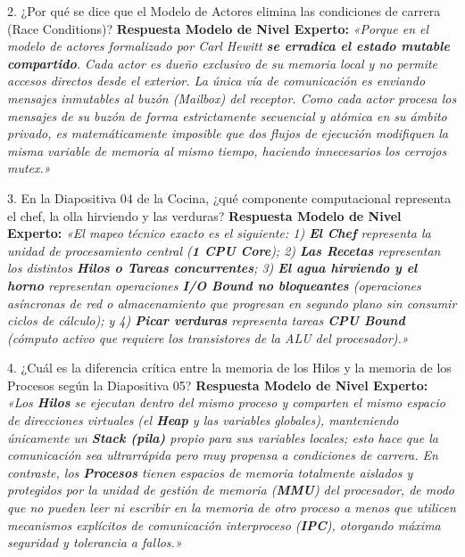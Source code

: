 \documentclass[11pt,a4paper]{article}
\begin{document}
\begin{qabox}{2. ¿Por qué se dice que el Modelo de Actores elimina las condiciones de carrera (Race Conditions)?}
\textbf{Respuesta Modelo de Nivel Experto:}  
\textit{«Porque en el modelo de actores formalizado por Carl Hewitt \textbf{se erradica el estado mutable compartido}. Cada actor es dueño exclusivo de su memoria local y no permite accesos directos desde el exterior. La única vía de comunicación es enviando mensajes inmutables al buzón (\textit{Mailbox}) del receptor. Como cada actor procesa los mensajes de su buzón de forma estrictamente secuencial y atómica en su ámbito privado, es matemáticamente imposible que dos flujos de ejecución modifiquen la misma variable de memoria al mismo tiempo, haciendo innecesarios los cerrojos mutex.»}
\end{qabox}

\begin{qabox}{3. En la Diapositiva 04 de la Cocina, ¿qué componente computacional representa el chef, la olla hirviendo y las verduras?}
\textbf{Respuesta Modelo de Nivel Experto:}  
\textit{«El mapeo técnico exacto es el siguiente: 1) \textbf{El Chef} representa la unidad de procesamiento central (\textbf{1 CPU Core}); 2) \textbf{Las Recetas} representan los distintos \textbf{Hilos o Tareas concurrentes}; 3) \textbf{El agua hirviendo y el horno} representan operaciones \textbf{I/O Bound no bloqueantes} (operaciones asíncronas de red o almacenamiento que progresan en segundo plano sin consumir ciclos de cálculo); y 4) \textbf{Picar verduras} representa tareas \textbf{CPU Bound} (cómputo activo que requiere los transistores de la ALU del procesador).»}
\end{qabox}

\begin{qabox}{4. ¿Cuál es la diferencia crítica entre la memoria de los Hilos y la memoria de los Procesos según la Diapositiva 05?}
\textbf{Respuesta Modelo de Nivel Experto:}  
\textit{«Los \textbf{Hilos} se ejecutan dentro del mismo proceso y comparten el mismo espacio de direcciones virtuales (el \textbf{Heap} y las variables globales), manteniendo únicamente un \textbf{Stack (pila)} propio para sus variables locales; esto hace que la comunicación sea ultrarrápida pero muy propensa a condiciones de carrera. En contraste, los \textbf{Procesos} tienen espacios de memoria totalmente aislados y protegidos por la unidad de gestión de memoria (\textbf{MMU}) del procesador, de modo que no pueden leer ni escribir en la memoria de otro proceso a menos que utilicen mecanismos explícitos de comunicación interproceso (\textbf{IPC}), otorgando máxima seguridad y tolerancia a fallos.»}
\end{qabox}
\end{document}
